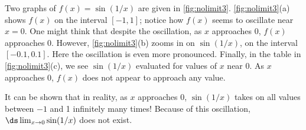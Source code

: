 %
{Two graphs of $f(x) = \sin(1/x)$ are given in \autoref{fig:nolimit3}. \autoref{fig:nolimit3}(a) shows $f(x)$ on the interval $[-1,1]$; notice how $f(x)$ seems to oscillate near $x=0$. One might think that despite the oscillation, as $x$ approaches 0, $f(x)$ approaches 0. However, \autoref{fig:nolimit3}(b) zooms in on $\sin(1/x)$, on the interval $[-0.1,0.1]$. Here the oscillation is even more pronounced. Finally, in the table in \autoref{fig:nolimit3}(c), we see $\sin(1/x)$ evaluated for values of $x$ near 0. As $x$ approaches 0, $f(x)$ does not appear to approach any value. 

It can be shown that in reality, as $x$ approaches 0, $\sin(1/x)$ takes on all values between $-1$ and 1 infinitely many times! Because of this oscillation,
$\ds\lim_{x\to 0}\sin(1/x)$ does not exist.}

